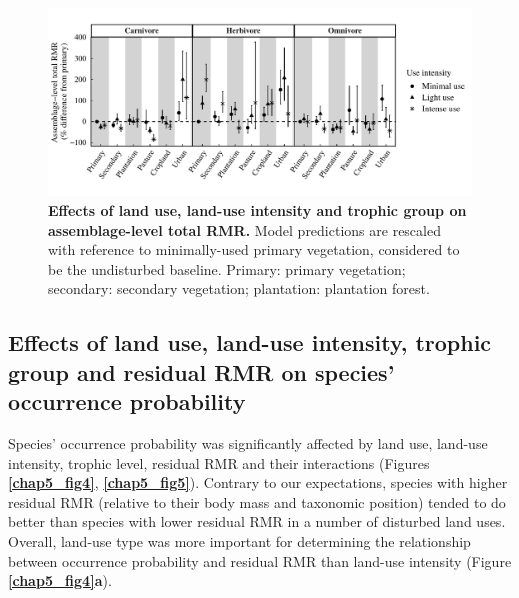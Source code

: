 \begin{figure}[h!]
\centering
\includegraphics[scale=0.75]{figures/Chapter5/Figure3}
\caption[Effects of land use, land-use intensity and trophic group on assemblage-level total RMR.]{\textbf{Effects of land use, land-use intensity and trophic group on assemblage-level total RMR.} Model predictions are rescaled with reference to minimally-used primary vegetation, considered to be the undisturbed baseline. Primary: primary vegetation; secondary: secondary vegetation; plantation: plantation forest. }
\label{chap5_fig3}
\end{figure}


\subsection{Effects of land use, land-use intensity, trophic group and residual RMR on species’ occurrence probability}

Species’ occurrence probability was significantly affected by land use, land-use intensity, trophic level, residual RMR and their interactions (Figures \textbf{\ref{chap5_fig4}}, \textbf{\ref{chap5_fig5}}). Contrary to our expectations, species with higher residual RMR (relative to their body mass and taxonomic position) tended to do better than species with lower residual RMR in a number of disturbed land uses. Overall, land-use type was more important for determining the relationship between occurrence probability and residual RMR than land-use intensity (Figure \textbf{\ref{chap5_fig4}a}).

